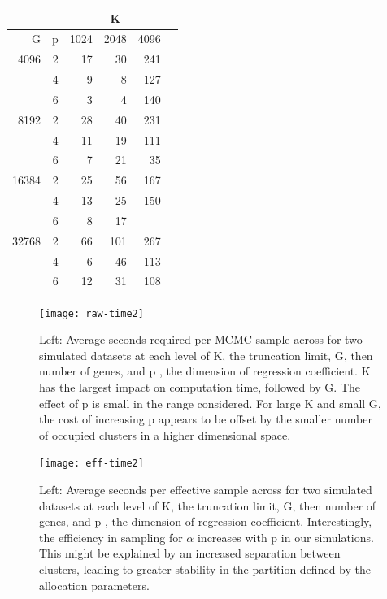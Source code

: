 {\begin{table}[ht]
\begin{tabular}{rrrrrr}
  &   & \multicolumn{3}{c}{K}\\
  \hline
G & p & 1024 & 2048 & 4096 \\ 
  \hline
4096  & 2 & 17 & 30 & 241 \\ 
      & 4 & 9 & 8 & 127 \\ 
      & 6 & 3 & 4 & 140 \\ 
8192  & 2 & 28 & 40 & 231 \\ 
      & 4 & 11 & 19 & 111 \\ 
      & 6 & 7 & 21 & 35 \\ 
16384 & 2 & 25 & 56 & 167 \\ 
      & 4 & 13 & 25 & 150 \\ 
      & 6 & 8 & 17 &  \\ 
32768 & 2 & 66 & 101 & 267 \\ 
      & 4 & 6 & 46 & 113 \\ 
      & 6 & 12 & 31 & 108 \\ 
   \hline
\end{tabular}

\end{table}


\begin{figure}[ht]
\centering
\texttt{[image: raw-time2]}
\caption[Average number of seconds per MCMC sample]{Left: Average seconds required per MCMC sample across for two simulated datasets at each level of K, the truncation limit, G, then number of genes, and p , the dimension of regression coefficient. K has the largest impact on computation time, followed by G. The effect of p is small in the range considered. For large K and small G, the cost of increasing p appears to be offset by the smaller number of occupied clusters in a higher dimensional space.}%
\label{raw-time}
\end{figure}

\begin{figure}[ht]
\centering
\texttt{[image: eff-time2]}
\caption[Average seconds per effective sample]{Left: Average seconds per effective sample across for two simulated datasets at each level of K, the truncation limit, G, then number of genes, and p , the dimension of regression coefficient. Interestingly, the efficiency in sampling for $\alpha$ increases with p in our simulations. This might be explained by an increased separation between clusters, leading to greater stability in the partition defined by the allocation parameters.}%
\label{eff-time}
\end{figure}

}
